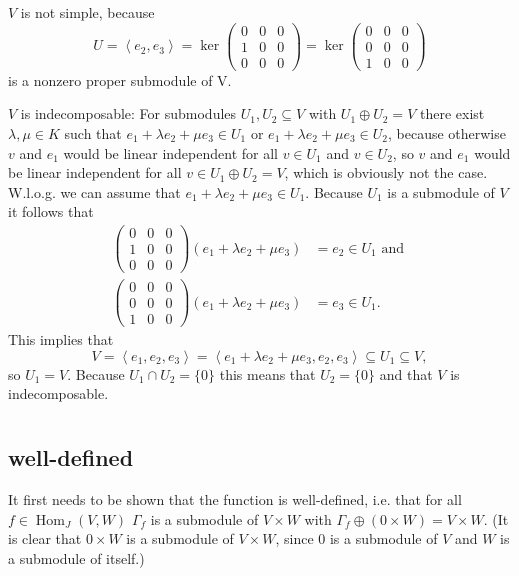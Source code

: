 \documentclass[a4paper,10pt]{article}
\newcommand{\Hom}{\operatorname{Hom}}
\newcommand{\gen}[1]{\left\langle#1\right\rangle}
\newcommand{\vect}[1]{\begin{pmatrix}#1\end{pmatrix}}
\begin{document}
$V$ is not simple, because \[U = \gen{e_2,e_3} = \ker \vect{0&0&0\\1&0&0\\0&0&0} = \ker \vect{0&0&0\\0&0&0\\1&0&0}\] is a nonzero proper submodule of V.

$V$ is indecomposable: For submodules $U_1, U_2 \subseteq V$ with $U_1 \oplus U_2 = V$ there exist $\lambda, \mu \in K$ such that $e_1 + \lambda e_2 + \mu e_3 \in U_1$ or $e_1 + \lambda e_2 + \mu e_3 \in U_2$, because otherwise $v$ and $e_1$ would be linear independent for all $v \in U_1$ and $v \in U_2$, so $v$ and $e_1$ would be linear independent for all $v \in U_1 \oplus U_2 = V$, which is obviously not the case. W.l.o.g. we can assume that $e_1 + \lambda e_2 + \mu e_3 \in U_1$. Because $U_1$ is a submodule of $V$ it follows that
\begin{align*}
 \vect{0&0&0\\1&0&0\\0&0&0} (e_1 + \lambda e_2 + \mu e_3) &= e_2 \in U_1 \text{ and } \\
 \vect{0&0&0\\0&0&0\\1&0&0} (e_1 + \lambda e_2 + \mu e_3) &= e_3 \in U_1.
\end{align*}
This implies that
\[V = \gen{e_1, e_2, e_3} = \gen{e_1 + \lambda e_2 + \mu e_3, e_2, e_3} \subseteq U_1 \subseteq V, \]
so $U_1 = V$. Because $U_1 \cap U_2 = \{0\}$ this means that $U_2 = \{0\}$ and that $V$ is indecomposable.





\section{}

\subsection*{well-defined}
It first needs to be shown that the function is well-defined, i.e. that for all $f \in \Hom_J(V,W)$ $\Gamma_f$ is a submodule of $V \times W$ with $\Gamma_f \oplus (0 \times W) = V \times W$. (It is clear that $0 \times W$ is a submodule of $V \times W$, since $0$ is a submodule of $V$ and $W$ is a submodule of itself.)
\end{document}
